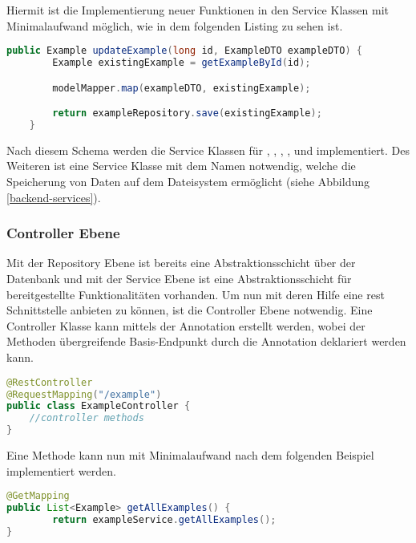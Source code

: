 Hiermit ist die Implementierung neuer Funktionen in den Service Klassen mit Minimalaufwand möglich, wie in dem folgenden Listing zu sehen ist.
\begin{lstlisting}[language=Java]
public Example updateExample(long id, ExampleDTO exampleDTO) {
        Example existingExample = getExampleById(id);

        modelMapper.map(exampleDTO, existingExample);

        return exampleRepository.save(existingExample);
    }
\end{lstlisting}

Nach diesem Schema werden die Service Klassen für , , , ,  und  implementiert. Des Weiteren ist eine Service Klasse mit dem Namen  notwendig, welche die Speicherung von Daten auf dem Dateisystem ermöglicht (siehe Abbildung \ref{backend-services}).

\clearpage


\clearpage

\subsubsection{Controller Ebene}
Mit der Repository Ebene ist bereits eine Abstraktionsschicht über der Datenbank und mit der Service Ebene ist eine Abstraktionsschicht für bereitgestellte Funktionalitäten vorhanden. Um nun mit deren Hilfe eine \gls{rest} Schnittstelle anbieten zu können, ist die Controller Ebene notwendig.
Eine Controller Klasse kann mittels der Annotation  erstellt werden, wobei der Methoden übergreifende Basis-Endpunkt durch die Annotation  deklariert werden kann.
\begin{lstlisting}[language=Java]
@RestController
@RequestMapping("/example")
public class ExampleController {
	//controller methods
}
\end{lstlisting}

Eine Methode kann nun mit Minimalaufwand nach dem folgenden Beispiel implementiert werden.
\begin{lstlisting}[language=Java]
@GetMapping
public List<Example> getAllExamples() {
        return exampleService.getAllExamples();
}
\end{lstlisting}

